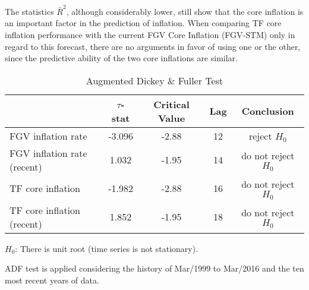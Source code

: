 \documentclass[10pt]{article}
\begin{document}
The statistics $\bar{R}^2$, although considerably lower, still show that the core inflation is an important factor in the prediction of inflation. When comparing TF core inflation performance with the current FGV Core Inflation (FGV-STM) only in regard to this forecast, there are no arguments in favor of using one or the other, since the predictive ability of the two core inflations are similar.


\vspace{0.3cm}

\begin{table}[]
\centering
\caption{Augmented Dickey \& Fuller Test}\label{adf_ipc_nucleos}
\begin{threeparttable}
\begin{tabular}{@{}l|cccc@{}}
\toprule
                     & \textbf{$\tau$-stat} & \textbf{Critical Value} & \textbf{Lag} & \textbf{Conclusion} \\ \midrule
FGV inflation rate          & -3.096               & -2.88                & 12           & reject $H_0$  \\
FGV inflation rate (recent) & 1.032                & -1.95                & 14           & do not reject $H_0$  \\
TF core inflation           & -1.982               & -2.88                & 16           & do not reject $H_0$  \\
TF core inflation (recent)  & 1.852                & -1.95                & 18           & do not reject $H_0$  \\ \bottomrule
\end{tabular}
\begin{tablenotes}
\item \scriptsize{$H_0$: There is unit root (time series is not stationary).}
\item \scriptsize{ADF test is applied considering the history of Mar/1999 to Mar/2016 and the ten most recent years of data.}
\end{tablenotes}
\end{threeparttable}
\end{table}
\end{document}
